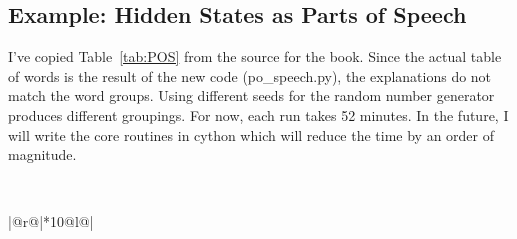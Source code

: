\documentclass[prelim,showlabels]{book}
\newcommand{\plotsize}{\small}
\begin{document}
\subsection{Example: Hidden States as Parts of Speech}
\label{sec:POSpeech}

I've copied Table~\ref{tab:POS} from the source for the book.  Since
the actual table of words is the result of the new code
(po\_speech.py), the explanations do not match the word groups.  Using
different seeds for the random number generator produces different
groupings.  For now, each run takes 52 minutes.  In the future, I will
write the core routines in cython which will reduce the time by an order of
magnitude.
\begin{table}[htb]
  \caption[Words most frequently associated with each state.]%
  {Words most frequently associated with each state.  While I have no
    interpretation for three of the states, some of the following
    interpretations of the other states are strikingly successful.}
  \begin{center}{\plotsize%
      \\[2.0ex]
      \begin{tabular}{|@{\hspace{0.10em}}r@{\hspace{0.40em}}|*{10}{@{\hspace{0.28em}}l@{\hspace{0.28em}}}|}
        \hline
      \end{tabular}
    }\end{center}
  \label{tab:POS}
\end{table}
\end{document}
